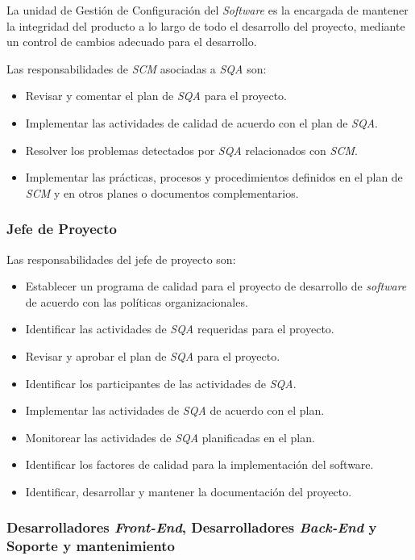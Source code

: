 La unidad de Gestión de Configuración del \emph{Software} es la encargada de mantener la integridad del producto a lo largo de todo el desarrollo del proyecto, mediante un control de cambios adecuado para el desarrollo.

Las responsabilidades de \emph{SCM} asociadas a \emph{SQA} son: 

	\begin{itemize}
		\item 
		Revisar y comentar el plan de \emph{SQA} para el proyecto. 
		\item
		Implementar las actividades de calidad de acuerdo con el plan de \emph{SQA}. 
		 \item
		Resolver los problemas detectados por \emph{SQA} relacionados con \emph{SCM}.
		 \item 
		Implementar las prácticas, procesos y procedimientos definidos en el plan de \emph{SCM} y en otros planes o documentos complementarios.
	\end{itemize}

\subsubsection{Jefe de Proyecto}

Las responsabilidades del jefe de proyecto son:

\begin{itemize}
		\item 
		Establecer un programa de calidad para el proyecto de desarrollo de \emph{software} de acuerdo con las políticas organizacionales.
		\item
		Identificar las actividades de \emph{SQA} requeridas para el proyecto.
		\item
		Revisar y aprobar el plan de \emph{SQA} para el proyecto.
		\item 
		Identificar los participantes de las actividades de \emph{SQA}.
		\item
		Implementar las actividades de \emph{SQA} de acuerdo con el plan.
		\item
		Monitorear las actividades de \emph{SQA} planificadas en el plan.
		\item
		Identificar los factores de calidad para la implementación del software.
		\item
		Identificar, desarrollar y mantener la documentación del proyecto. 
	\end{itemize}

\subsubsection{Desarrolladores \emph{Front-End}, Desarrolladores \emph{Back-End} y Soporte y mantenimiento}

